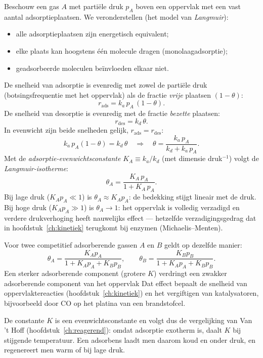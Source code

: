Beschouw een gas $A$ met partiële druk $p_A$ boven een oppervlak met een vast aantal adsorptieplaatsen. We veronderstellen (het model van \emph{Langmuir}):
\begin{itemize}
\item alle adsorptieplaatsen zijn energetisch equivalent;
\item elke plaats kan hoogstens \'e\'en molecule dragen (monolaagadsorptie);
\item geadsorbeerde moleculen be\"invloeden elkaar niet.
\end{itemize}
De snelheid van adsorptie is evenredig met zowel de partiële druk (botsingsfrequentie met het oppervlak) als de fractie \emph{vrije} plaatsen $(1-\theta)$:
\[
r_{\text{ads}} = k_a\,p_A\,(1-\theta).
\]
De snelheid van desorptie is evenredig met de fractie \emph{bezette} plaatsen:
\[
r_{\text{des}} = k_d\,\theta.
\]
In evenwicht zijn beide snelheden gelijk, $r_{\text{ads}}=r_{\text{des}}$:
\[
k_a\,p_A(1-\theta) = k_d\,\theta \quad\Longrightarrow\quad \theta = \frac{k_a\,p_A}{k_d+k_a\,p_A}.
\]
Met de \emph{adsorptie-evenwichtsconstante} $K_A\equiv k_a/k_d$ (met dimensie druk$^{-1}$) volgt de \emph{Langmuir-isotherme}:
\begin{equation}
\boxed{\;\theta_A = \frac{K_A\,p_A}{1+K_A\,p_A}.\;}
\label{eq:langmuir-isotherm}
\end{equation}
Bij lage druk ($K_Ap_A\ll1$) is $\theta_A\approx K_Ap_A$: de bedekking stijgt lineair met de druk. Bij hoge druk ($K_Ap_A\gg1$) is $\theta_A\to1$: het oppervlak is volledig verzadigd en verdere drukverhoging heeft nauwelijks effect --- hetzelfde verzadigingsgedrag dat in hoofdstuk~\ref{ch:kinetiek} terugkomt bij enzymen (Michaelis--Menten).

Voor twee competitief adsorberende gassen $A$ en $B$ geldt op dezelfde manier:
\begin{equation}
\theta_A = \frac{K_Ap_A}{1+K_Ap_A+K_Bp_B}, \qquad \theta_B = \frac{K_Bp_B}{1+K_Ap_A+K_Bp_B}.
\label{eq:langmuir-competitief}
\end{equation}
Een sterker adsorberende component (grotere $K$) verdringt een zwakker adsorberende component van het oppervlak Dat effect bepaalt de snelheid van oppervlaktereacties (hoofdstuk~\ref{ch:kinetiek}) en het vergiftigen van katalysatoren, bijvoorbeeld door CO op het platina van een brandstofcel.

De constante $K$ is een evenwichtsconstante en volgt dus de vergelijking van Van 't Hoff (hoofdstuk~\ref{ch:reagerend}): omdat adsorptie exotherm is, daalt $K$ bij stijgende temperatuur. Een adsorbens laadt men daarom koud en onder druk, en regenereert men warm of bij lage druk.

